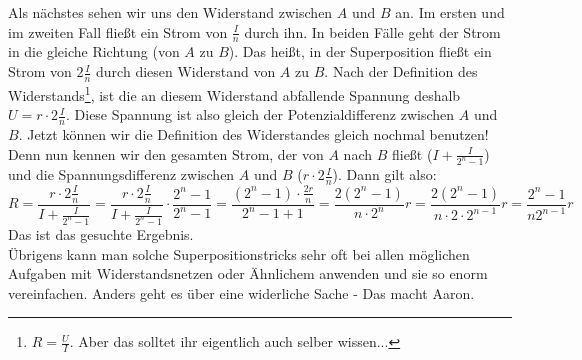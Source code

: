 \begin{Answer}[ref = hypercube]
	Als nächstes sehen wir uns den Widerstand zwischen $A$ und $B$ an. Im ersten und im zweiten Fall fließt ein Strom von $\frac{I}{n}$ durch ihn. In beiden Fälle geht der Strom in die gleiche Richtung (von $A$ zu $B$). Das heißt, in der Superposition fließt ein Strom von $2\frac{I}{n}$ durch diesen Widerstand von $A$ zu $B$. Nach der Definition des Widerstands\footnote{$R=\frac{U}{I}$. Aber das solltet ihr eigentlich auch selber wissen...}, ist die an diesem Widerstand abfallende Spannung deshalb $U=r\cdot 2\frac{I}{n}$. Diese Spannung ist also gleich der Potenzialdifferenz zwischen $A$ und $B$. Jetzt können wir die Definition des Widerstandes gleich nochmal benutzen! Denn nun kennen wir den gesamten Strom, der von $A$ nach $B$ fließt ($I+\frac{I}{2^n-1}$) und die Spannungsdifferenz zwischen $A$ und $B$ ($r\cdot 2\frac{I}{n}$). Dann gilt also:
	\begin{equation*}
	R = \frac{r\cdot 2\frac{I}{n}}{I+\frac{I}{2^n-1}} = \frac{r\cdot 2\frac{I}{n}}{I+\frac{I}{2^n-1}} \cdot \frac{2^n-1}{2^n-1} = \frac{(2^n-1)\cdot \frac{2r}{n}}{2^n-1+1} = \frac{2(2^n-1)}{n \cdot 2^n}r = \frac{2(2^n-1)}{n \cdot 2 \cdot 2^{n-1}}r = \frac{2^n-1}{n2^{n-1}}r
	\end{equation*}
	Das ist das gesuchte Ergebnis.\\
	Übrigens kann man solche Superpositionstricks sehr oft bei allen möglichen Aufgaben mit Widerstandsnetzen oder Ähnlichem anwenden und sie so enorm vereinfachen.  
	Anders geht es über eine widerliche Sache - Das macht Aaron.
\end{Answer}
